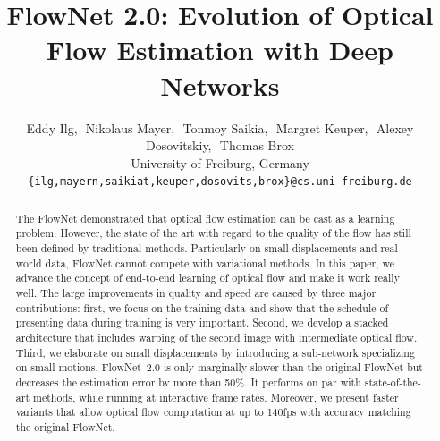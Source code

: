 \documentclass[10pt,twocolumn,letterpaper]{article}%
\begin{document}
\title{FlowNet 2.0: Evolution of Optical Flow Estimation with Deep Networks}


\newcommand{\authorfont}[1]{#1}

\author{
\authorfont{Eddy Ilg},\,\, 
\authorfont{Nikolaus Mayer},\,\,
\authorfont{Tonmoy Saikia},\,\,
\authorfont{Margret Keuper},\,\, 
\authorfont{Alexey Dosovitskiy},\,\, 
\authorfont{Thomas Brox} \vspace*{1mm}
\\
\authorfont{University of Freiburg, Germany}\\
{\tt\small \{ilg,mayern,saikiat,keuper,dosovits,brox\}@cs.uni-freiburg.de}
}

\maketitle

\begin{abstract}
The FlowNet demonstrated that optical flow estimation can be cast as a learning problem. However, the state of the art with regard to the quality of the flow has still been defined by traditional methods. Particularly on small displacements and real-world data, FlowNet cannot compete with variational methods. In this paper, we advance the concept of end-to-end learning of optical flow and make it work really well.  
The large improvements in quality and speed are caused by three major contributions: first, we focus on the training data and show that the schedule of presenting data during training is very important. Second, we develop a stacked architecture that includes warping of the second image with intermediate optical flow.
Third, we elaborate on small displacements by introducing a sub-network specializing on small motions.
FlowNet~2.0 is only marginally slower than the original FlowNet but decreases the estimation error by more than 50\%. 
It performs on par with state-of-the-art methods, while running at interactive frame rates. 
Moreover, we present faster variants that allow optical flow computation at up to 140fps with accuracy matching the original FlowNet. 
\end{abstract}
\end{document}

